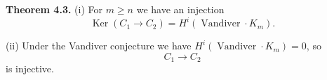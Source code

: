 \textbf{Theorem 4.3.}
(i) For $m \geq n$ we have an injection
$$\operatorname{Ker}(C_1 \to C_2) = H^i(\operatorname{Vandiver} \cdot K_m).$$

(ii) Under the Vandiver conjecture we have $H^i(\operatorname{Vandiver} \cdot K_m) = 0$, so
$$C_1 \to C_2$$
is injective.
